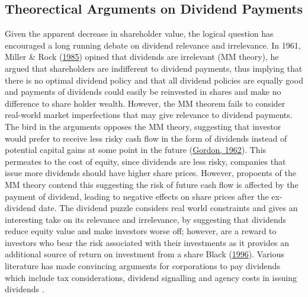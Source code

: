 \documentclass[12pt,preprint, authoryear]{elsarticle}
\numberwithin{equation}{section}
\numberwithin{figure}{section}
\numberwithin{table}{section}
\begin{document}
\hypertarget{theorectical-arguments-on-dividend-payments}{%
\subsection{Theorectical Arguments on Dividend
Payments}\label{theorectical-arguments-on-dividend-payments}}

Given the apparent decrease in shareholder value, the logical question
has encouraged a long running debate on dividend relevance and
irrelevance. In 1961, Miller \& Rock
(\protect\hyperlink{ref-miller1985dividend}{1985}) opined that dividends
are irrelevant (MM theory), he argued that shareholders are indifferent
to dividend payments, thus implying that there is no optimal dividend
policy and that all dividend policies are equally good and payments of
dividends could easily be reinvested in shares and make no difference to
share holder wealth. However, the MM theorem fails to consider
real-world market imperfections that may give relevance to dividend
payments. The bird in the arguments opposes the MM theory, suggesting
that investor would prefer to receive less risky cash flow in the form
of dividends instead of potential capital gains at some point in the
future (\protect\hyperlink{ref-gordon1962}{Gordon, 1962}). This
permeates to the cost of equity, since dividends are less risky,
companies that issue more dividends should have higher share prices.
However, propoents of the MM theory contend this suggesting the risk of
future cash flow is affected by the payment of dividend, leading to
negative effects on share prices after the ex-dividend date. The
dividend puzzle considers real world constraints and gives an
interesting take on its relevance and irrelevance, by suggesting that
dividends reduce equity value and make investors worse off; however, are
a reward to investors who bear the risk associated with their
investments as it provides an additional source of return on investment
from a share Black (\protect\hyperlink{ref-black1996dividend}{1996}).
Various literature has made convincing arguments for corporations to pay
dividends which include tax considerations, dividend signalling and
agency costs in issuing dividends .
\end{document}

